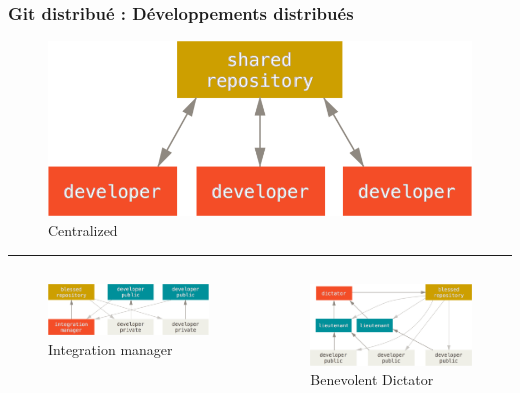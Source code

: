 \documentclass[table,tikz,12pt,svgnames]{beamer}
\begin{document}
\begin{frame}
\frametitle{Git distribué : Développements distribués}

\begin{figure}
	\centering
	\includegraphics[scale=0.3]{images/centralized_workflow-trim.png}\\
	\small Centralized
\end{figure}

\vspace{-1em}
\color{gray}\rule{\linewidth}{2pt}
\pause
\begin{adjustwidth}{-2cm}{-1cm}{}
	\begin{columns}[T] %
		\begin{column}{.5\textwidth}
			\begin{figure}
				\includegraphics[scale=0.22]{images/integration-manager-trim.png}
				\small {Integration manager}
			\end{figure}
		\end{column}%
		\begin{column}{.6\textwidth}
			\vspace{-0.35em}
			\begin{figure}
				\hfill%
				\includegraphics[scale=0.23]{images/benevolent-dictator-trim.png}
				Benevolent Dictator
			\end{figure}
		\end{column}%
	\end{columns}
\end{adjustwidth}
\end{frame}
\end{document}
